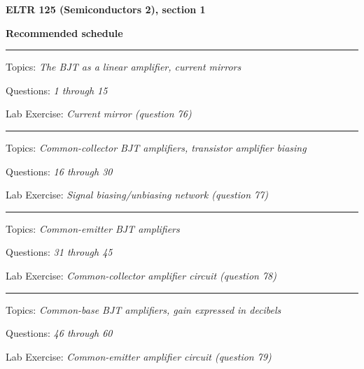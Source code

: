 
\centerline{\bf ELTR 125 (Semiconductors 2), section 1} \bigskip 
 
\vskip 10pt

\noindent
{\bf Recommended schedule}

\vskip 5pt

\hrule \vskip 5pt
\noindent
{}

\hskip 10pt Topics: {\it The BJT as a linear amplifier, current mirrors}
 
\hskip 10pt Questions: {\it 1 through 15}
 
\hskip 10pt Lab Exercise: {\it Current mirror (question 76)}
 


\vskip 10pt
\hrule \vskip 5pt
\noindent
{}

\hskip 10pt Topics: {\it Common-collector BJT amplifiers, transistor amplifier biasing}
 
\hskip 10pt Questions: {\it 16 through 30}
 
\hskip 10pt Lab Exercise: {\it Signal biasing/unbiasing network (question 77)}
 
 

\vskip 10pt
\hrule \vskip 5pt
\noindent
{}

\hskip 10pt Topics: {\it Common-emitter BJT amplifiers}
 
\hskip 10pt Questions: {\it 31 through 45}
 
\hskip 10pt Lab Exercise: {\it Common-collector amplifier circuit (question 78)}
 

\vskip 10pt
\hrule \vskip 5pt
\noindent
{}

\hskip 10pt Topics: {\it Common-base BJT amplifiers, gain expressed in decibels}
 
\hskip 10pt Questions: {\it 46 through 60}
 
\hskip 10pt Lab Exercise: {\it Common-emitter amplifier circuit (question 79)}
 
